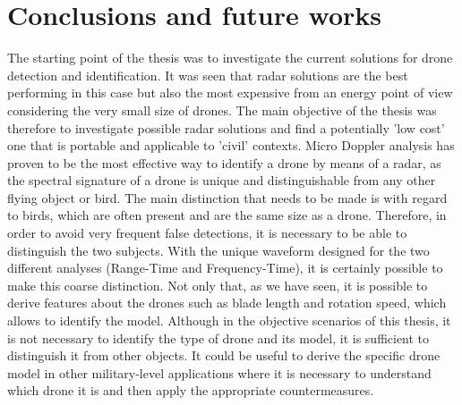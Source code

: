 \chapter{Conclusions and future works}
The starting point of the thesis was to investigate the current solutions for drone detection and identification. It was seen that radar solutions are the best performing in this case but also the most expensive from an energy point of view considering the very small size of drones. The main objective of the thesis was therefore to investigate possible radar solutions and find a potentially 'low cost' one that is portable and applicable to 'civil' contexts. Micro Doppler analysis has proven to be the most effective way to identify a drone by means of a radar, as the spectral signature of a drone is unique and distinguishable from any other flying object or bird. The main distinction that needs to be made is with regard to birds, which are often present and are the same size as a drone. Therefore, in order to avoid very frequent false detections, it is necessary to be able to distinguish the two subjects.
With the unique waveform designed for the two different analyses (Range-Time and Frequency-Time), it is certainly possible to make this coarse distinction. Not only that, as we have seen, it is possible to derive features about the drones such as blade length and rotation speed, which allows to identify the model. Although in the objective scenarios of this thesis, it is not necessary to identify the type of drone and its model, it is sufficient to distinguish it from other objects. It could be useful to derive the specific drone model in other military-level applications where it is necessary to understand which drone it is and then apply the appropriate countermeasures.\\

